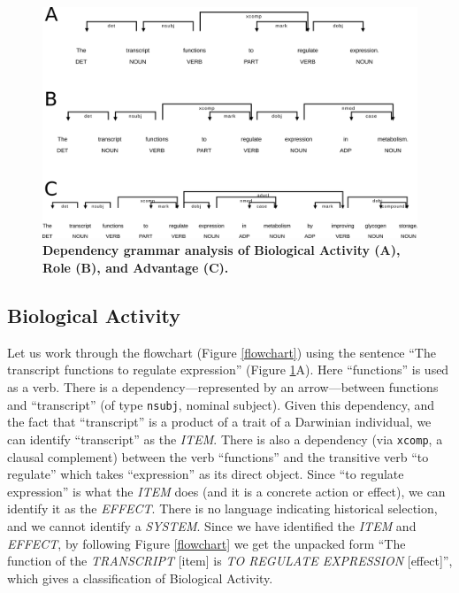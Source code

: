 \documentclass{article}
\begin{document}
\begin{figure}[ht]
  \centering
  \includegraphics[width=\linewidth]{combined_eff_role_adv.png}
  \caption[]{\textbf{Dependency grammar analysis of Biological Activity (A), Role (B), and Advantage (C).}}
  \label{eff_role_adv}
\end{figure}

\subsection{Biological Activity}
\label{sec:biological-activity}

Let us work through the flowchart (Figure \ref{flowchart}) using the sentence ``The transcript functions to regulate expression'' (Figure \ref{eff_role_adv}A).
Here ``functions'' is used as a verb.
There is a dependency---represented by an arrow---between functions and ``transcript'' (of type \texttt{nsubj}, nominal subject).
Given this dependency, and the fact that ``transcript'' is a product of a trait of a Darwinian individual, we can identify ``transcript'' as the \emph{ITEM}.
There is also a dependency (via \texttt{xcomp}, a clausal complement) between the verb ``functions'' and the transitive verb ``to regulate'' which takes ``expression'' as its direct object.
Since ``to regulate expression'' is what the \emph{ITEM} does (and it is a concrete action or effect), we can identify it as the \emph{EFFECT}.
There is no language indicating historical selection, and we cannot identify a \emph{SYSTEM}.
Since we have identified the \emph{ITEM} and \emph{EFFECT}, by following Figure \ref{flowchart} we get the unpacked form ``The function of the \emph{TRANSCRIPT} [item] is \emph{TO REGULATE EXPRESSION} [effect]'', which gives a classification of Biological Activity.
\end{document}
